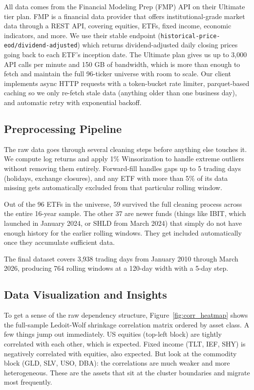 \documentclass[12pt, letterpaper]{article}
\begin{document}
All data comes from the Financial Modeling Prep (FMP) API on their Ultimate tier plan. FMP is a financial data provider that offers institutional-grade market data through a REST API, covering equities, ETFs, fixed income, economic indicators, and more. We use their stable endpoint (\texttt{historical-price-eod/dividend-adjusted}) which returns dividend-adjusted daily closing prices going back to each ETF's inception date. The Ultimate plan gives us up to 3,000 API calls per minute and 150 GB of bandwidth, which is more than enough to fetch and maintain the full 96-ticker universe with room to scale. Our client implements async HTTP requests with a token-bucket rate limiter, parquet-based caching so we only re-fetch stale data (anything older than one business day), and automatic retry with exponential backoff.

\subsection{Preprocessing Pipeline}

The raw data goes through several cleaning steps before anything else touches it. We compute log returns and apply 1\% Winsorization to handle extreme outliers without removing them entirely. Forward-fill handles gaps up to 5 trading days (holidays, exchange closures), and any ETF with more than 5\% of its data missing gets automatically excluded from that particular rolling window.

Out of the 96 ETFs in the universe, 59 survived the full cleaning process across the entire 16-year sample. The other 37 are newer funds (things like IBIT, which launched in January 2024, or SHLD from March 2024) that simply do not have enough history for the earlier rolling windows. They get included automatically once they accumulate sufficient data.

The final dataset covers 3,938 trading days from January 2010 through March 2026, producing 764 rolling windows at a 120-day width with a 5-day step.

\subsection{Data Visualization and Insights}

To get a sense of the raw dependency structure, Figure~\ref{fig:corr_heatmap} shows the full-sample Ledoit-Wolf shrinkage correlation matrix ordered by asset class. A few things jump out immediately. US equities (top-left block) are tightly correlated with each other, which is expected. Fixed income (TLT, IEF, SHY) is negatively correlated with equities, also expected. But look at the commodity block (GLD, SLV, USO, DBA): the correlations are much weaker and more heterogeneous. These are the assets that sit at the cluster boundaries and migrate most frequently.
\end{document}
